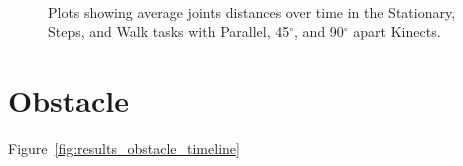 \begin{figure}[!h]
{  } \\

  \caption{Plots showing average joints distances over time in the Stationary, Steps, and Walk tasks with Parallel, 45$^{\circ}$, and 90$^{\circ}$ apart Kinects.}

  \label{fig:results_three_joints_over_time}
\end{figure}

\section{Obstacle}
\label{sec:results_obstacle}

Figure~\ref{fig:results_obstacle_timeline}

